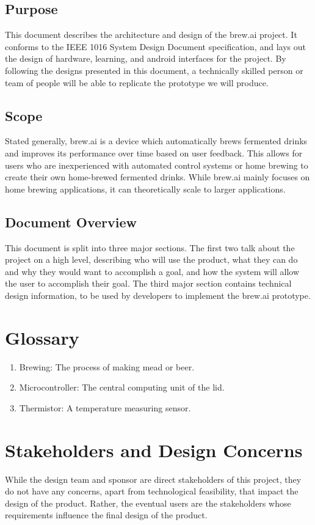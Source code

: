 \documentclass[draftclsnofoot,onecolumn,letterpaper,10pt]{IEEEtran}
\begin{document}
\subsection{Purpose}
This document describes the architecture and design of the brew.ai project.
It conforms to the IEEE 1016 System Design Document specification, and lays out the design of hardware, learning, and android interfaces for the project.
By following the designs presented in this document, a technically skilled person or team of people will be able to replicate the prototype we will produce.

\subsection{Scope}
Stated generally, brew.ai is a device which automatically brews fermented drinks and improves its performance over time based on user feedback.
This allows for users who are inexperienced with automated control systems or home brewing to create their own home-brewed fermented drinks.
While brew.ai mainly focuses on home brewing applications, it can theoretically scale to larger applications.

\subsection{Document Overview}
This document is split into three major sections.
The first two talk about the project on a high level, describing who will use the product, what they can do and why they would want to accomplish a goal, and how the system will allow the user to accomplish their goal.
The third major section contains technical design information, to be used by developers to implement the brew.ai prototype.


\section{Glossary}
\begin{enumerate}
	\item Brewing: The process of making mead or beer.
	\item Microcontroller: The central computing unit of the lid.
	\item Thermistor: A temperature measuring sensor.
\end{enumerate}
\section{Stakeholders and Design Concerns}
While the design team and sponsor are direct stakeholders of this project, they do not have any concerns, apart from technological feasibility, that impact the design of the product.
Rather, the eventual users are the stakeholders whose requirements influence the final design of the product.
\end{document}
